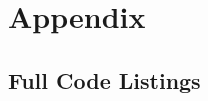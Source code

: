 \documentclass[12pt]{article}
\begin{document}
\clearpage

\clearpage
\section{Appendix} \label{appendix}

\subsection{Full Code Listings}

\clearpage
\end{document}
